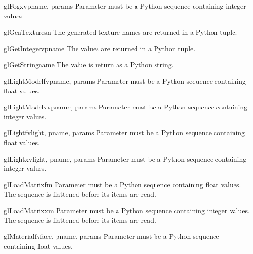 \begin{funcdesc}{glFogxv}{pname, params}
Parameter  must be a Python sequence containing integer values.
\end{funcdesc}

\begin{funcdesc}{glGenTextures}{n}
The generated texture names are returned in a Python tuple.
\end{funcdesc}

\begin{funcdesc}{glGetIntegerv}{pname}
The values are returned in a Python tuple.
\end{funcdesc}

\begin{funcdesc}{glGetString}{name}
The value is return as a Python string.
\end{funcdesc}

\begin{funcdesc}{glLightModelfv}{pname, params}
Parameter  must be a Python sequence containing float values.
\end{funcdesc}

\begin{funcdesc}{glLightModelxv}{pname, params}
Parameter  must be a Python sequence containing integer values.
\end{funcdesc}

\begin{funcdesc}{glLightfv}{light, pname, params}
Parameter  must be a Python sequence containing float values.
\end{funcdesc}

\begin{funcdesc}{glLightxv}{light, pname, params}
Parameter  must be a Python sequence containing integer values.
\end{funcdesc}

\begin{funcdesc}{glLoadMatrixf}{m}
Parameter  must be a Python sequence containing float values. The sequence
is flattened before its items are read.
\end{funcdesc}

\begin{funcdesc}{glLoadMatrixx}{m}
Parameter  must be a Python sequence containing integer values. The
sequence is flattened before its items are read.
\end{funcdesc}

\begin{funcdesc}{glMaterialfv}{face, pname, params}
Parameter  must be a Python sequence containing float values.
\end{funcdesc}

